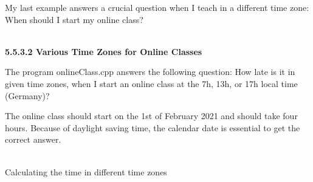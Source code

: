 My last example answers a crucial question when I teach in a different time zone: When should I start my online class?

\hspace*{\fill} \\ %
\noindent
\textbf{5.5.3.2\hspace{0.2cm} Various Time Zones for Online Classes}

The program onlineClass.cpp answers the following question: How late is it in given time zones, when I start an online class at the 7h, 13h, or 17h local time (Germany)?

The online class should start on the 1st of February 2021 and should take four hours. Because of daylight saving time, the calendar date is essential to get the correct answer.

\hspace*{\fill} \\ %
\noindent
Calculating the time in different time zones
